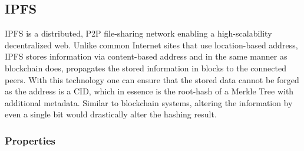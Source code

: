 \subsection{IPFS}
\label{ch:approach:intro:ipfs}

\ac{IPFS} is a distributed, \ac{P2P} file-sharing network enabling a high-scalability decentralized web\cite{benet2014ipfs}. Unlike common Internet sites that use location-based address, \ac{IPFS} stores information via content-based address and in the same manner as blockchain does, propagates the stored information in blocks to the connected peers. With this technology one can ensure that the stored data cannot be forged as the address is a \ac{CID}, which in essence is the root-hash of a Merkle Tree with additional metadata. Similar to blockchain systems, altering the information by even a single bit would drastically alter the hashing result.

\subsubsection{Properties}

